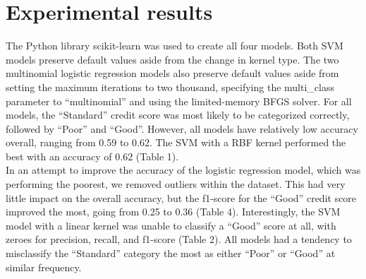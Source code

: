 \documentclass[twocolumn]{article}
\begin{document}
\section*{Experimental results}
The Python library scikit-learn was used to create all four models. Both SVM models preserve default values aside from the change
in kernel type. The two multinomial logistic regression models also preserve default values aside from setting the maximum iterations
to two thousand, specifying the multi\_class parameter to ``multinomial'' and using the limited-memory BFGS solver.
For all models, the ``Standard'' credit score was most likely to be categorized correctly, followed by ``Poor'' and ``Good''. 
However, all models have relatively low accuracy overall, ranging from 0.59 to 0.62. The SVM with a RBF kernel performed the best with an
accuracy of 0.62 (Table 1). \\
In an attempt to improve the accuracy of the logistic regression model, which was performing the poorest, we removed outliers within the dataset.
This had very little impact on the overall accuracy, but the f1-score for the ``Good'' credit score improved the most, going from 0.25 to 0.36 (Table 4).
Interestingly, the SVM model with a linear kernel was unable to classify a ``Good'' score at all, with zeroes for precision, 
recall, and f1-score (Table 2). All models had a tendency to misclassify the ``Standard'' category the most as either ``Poor'' or 
``Good'' at similar frequency. 
\end{document}
